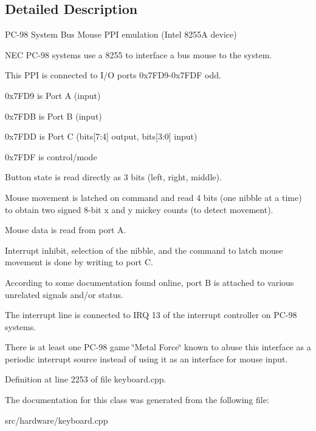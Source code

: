 \subsection{Detailed Description}
P\-C-\/98 System Bus Mouse P\-P\-I emulation (Intel 8255\-A device) 

N\-E\-C P\-C-\/98 systems use a 8255 to interface a bus mouse to the system.

This P\-P\-I is connected to I/\-O ports 0x7\-F\-D9-\/0x7\-F\-D\-F odd.
\begin{DoxyItemize}
\item 0x7\-F\-D9 is Port A (input)
\item 0x7\-F\-D\-B is Port B (input)
\item 0x7\-F\-D\-D is Port C (bits\mbox{[}7\-:4\mbox{]} output, bits\mbox{[}3\-:0\mbox{]} input)
\item 0x7\-F\-D\-F is control/mode
\end{DoxyItemize}

Button state is read directly as 3 bits (left, right, middle).

Mouse movement is latched on command and read 4 bits (one nibble at a time) to obtain two signed 8-\/bit x and y mickey counts (to detect movement).

Mouse data is read from port A.

Interrupt inhibit, selection of the nibble, and the command to latch mouse movement is done by writing to port C.

According to some documentation found online, port B is attached to various unrelated signals and/or status.

The interrupt line is connected to I\-R\-Q 13 of the interrupt controller on P\-C-\/98 systems.

There is at least one P\-C-\/98 game \char`\"{}\-Metal Force\char`\"{} known to abuse this interface as a periodic interrupt source instead of using it as an interface for mouse input. 

Definition at line 2253 of file keyboard.\-cpp.



The documentation for this class was generated from the following file\-:\begin{DoxyCompactItemize}
\item 
src/hardware/keyboard.\-cpp\end{DoxyCompactItemize}
